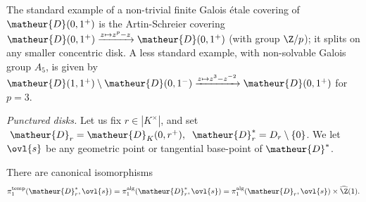 \medskip The standard example of a non-trivial finite Galois \'etale
 covering of $\matheur{D}(0,1^+)$ is the Artin-Schreier covering
 $\matheur{D}(0,1^+) \xrightarrow{z\mapsto z^p-z} \matheur{D}(0,1^+)$
 (with group $\Z/p$); it splits on any smaller concentric disk.
 A less standard 
 example, with non-solvable Galois group $A_5$, is given by $\matheur{D}(1,1^+)
 \setminus \matheur{D}(0,1^-) \xrightarrow{z\mapsto z^3-z^{-2}}
 \matheur{D}(0,1^+)$ for $p=3$.
 
\begin{para}\label{para::2.3.6} {\it Punctured disks.} Let us fix $r\in  {|
 K^\times|}$, and set $\; \matheur{D}_r=\matheur{D}_K(0,r^+),\;\;
 \matheur{D}_r^\ast=D_r\setminus \{0\}$.  We let $\ovl{s}$ be any
 geometric point or tangential base-point of $\matheur{D}^\ast$.
\end{para}

\begin{pro}\label{pro::2.3.7} There are canonical isomorphisms 
\begin{equation*}
\pi_1^{\mathrm{temp}}(\matheur{D}_r^\ast,\ovl{s})=
 \pi_1^{\mathrm{alg}}(\matheur{D}_r^\ast,\ovl{s})=
 \pi_1^{\mathrm{alg}}(\matheur{D}_r,\ovl{s})\times \widehat{\Z}(1).
\end{equation*}
\end{pro}

